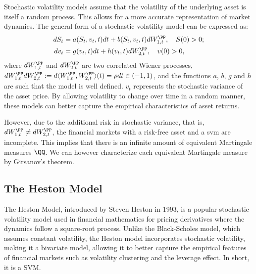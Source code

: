 \documentclass[11pt]{article}
\numberwithin{equation}{section}
\begin{document}
Stochastic volatility models assume that the volatility of the underlying asset is itself a random process. This allows for a more accurate representation of market dynamics. The general form of a stochastic volatility model can be expressed as:
\begin{align*}
    dS_t &= a(S_t, v_t, t)  dt + b(S_t, v_t, t)  dW_{1,t}^\PP, \quad S(0) > 0; \\
    dv_t &= g(v_t, t) dt + h(v_t, t)  dW_{2,t}^\PP, \quad v(0) > 0,
\end{align*}
where $dW_{1,t}^\PP$ and $dW_{2,t}^\PP$ are two correlated Wiener processes, $
dW_{1,t}^\PP dW_{2,t}^\PP := d\langle W_{1,t}^\PP, W_{2,t}^\PP \rangle(t) = \rho dt \in (-1, 1)$, and
the functions $a$, $b$, $g$ and $h$ are such that the model is well defined.
$v_t$ represents the stochastic variance of the asset price. By allowing
volatility to change over time in a random manner, these models can better
capture the empirical characteristics of asset returns. 

However, due to the additional risk in stochastic variance, that is,
$dW_{1,t}^\PP\neq dW_{2,t}^\PP$, the financial markets with a risk-free asset
and a svm are incomplete. This implies that there is an infinite amount of
equivalent Martingale measures $\QQ$. We can however characterize each
equivalent Martingale measure by Girsanov's theorem. 

\subsection{The Heston Model}
The Heston Model, introduced by Steven Heston in 1993, is a popular stochastic
volatility model used in financial mathematics for pricing derivatives where the
dynamics follow a square-root process. Unlike
the Black-Scholes model, which assumes constant volatility, the Heston model
incorporates stochastic volatility, making it a bivariate model, allowing it to better capture the empirical
features of financial markets such as volatility clustering and the leverage
effect. In short, it is a SVM.
\end{document}
